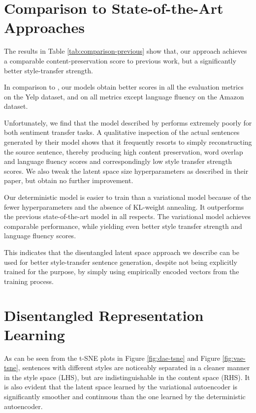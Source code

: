 \section{Comparison to State-of-the-Art Approaches}

The results in Table \ref{tab:comparison-previous} show that, our approach achieves a comparable content-preservation score to previous work, but a significantly better style-transfer strength.

In comparison to \cite{shen2017style}, our models obtain better scores in all the evaluation metrics on the Yelp dataset, and on all metrics except language fluency on the Amazon dataset.

Unfortunately, we find that the model described by \cite{fu2017style} performs extremely poorly for both sentiment transfer tasks. A qualitative inspection of the actual sentences generated by their model shows that it frequently resorts to simply reconstructing the source sentence, thereby producing high content preservation, word overlap and language fluency scores and correspondingly low style transfer strength scores. We also tweak the latent space size hyperparameters as described in their paper, but obtain no further improvement.

Our deterministic model is easier to train than a variational model because of the fewer hyperparameters and the absence of KL-weight annealing. It outperforms the previous state-of-the-art model \citep{shen2017style} in all respects. The variational model achieves comparable performance, while yielding even better style transfer strength and language fluency scores.

This indicates that the disentangled latent space approach we describe can be used for better style-transfer sentence generation, despite not being explicitly trained for the purpose, by simply using empirically encoded vectors from the training process.


\section{Disentangled Representation Learning}

As can be seen from the t-SNE plots in Figure \ref{fig:dae-tsne} and Figure \ref{fig:vae-tsne}, sentences with different styles are noticeably separated in a cleaner manner in the style space (LHS), but are indistinguishable in the content space (RHS). It is also evident that the latent space learned by the variational autoencoder is significantly smoother and continuous than the one learned by the deterministic autoencoder.

